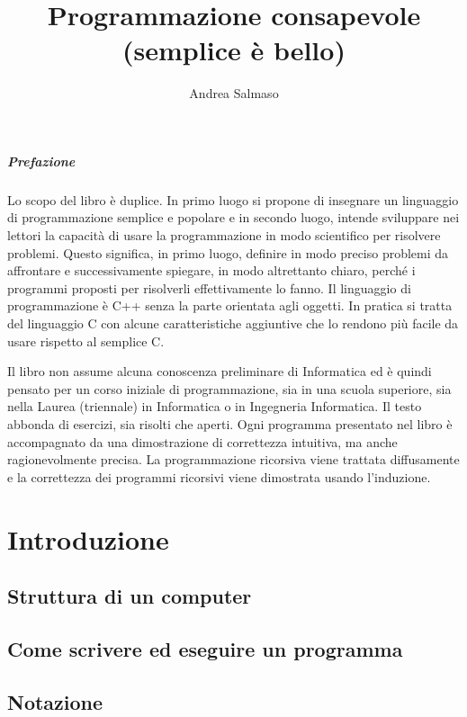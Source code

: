 \documentclass[a4paper,12pt]{book}
\begin{document}
\author{Andrea Salmaso}
\title{Programmazione consapevole \\ (semplice è bello)}
\maketitle

\tableofcontents

\newpage

\paragraph{Prefazione}
Lo scopo del libro è duplice. In primo luogo si propone di insegnare un linguaggio di programmazione semplice e popolare e in secondo luogo, intende sviluppare nei lettori la capacità di usare la programmazione in modo scientifico per risolvere problemi. Questo significa, in primo luogo, definire in modo preciso  problemi da affrontare e successivamente spiegare, in modo altrettanto chiaro, perché i programmi proposti per risolverli effettivamente lo fanno. Il linguaggio di programmazione è C++ senza la parte orientata agli oggetti. In pratica si tratta del linguaggio C con alcune caratteristiche aggiuntive che lo rendono più facile da usare rispetto al semplice C.

Il libro non assume alcuna conoscenza preliminare di Informatica ed è quindi pensato per un corso iniziale di programmazione, sia in una scuola superiore, sia nella Laurea (triennale) in Informatica o in Ingegneria Informatica. Il testo abbonda di esercizi, sia risolti che aperti. Ogni programma presentato nel libro è accompagnato da una dimostrazione di correttezza intuitiva, ma anche ragionevolmente precisa. La programmazione ricorsiva viene trattata diffusamente e la correttezza dei programmi ricorsivi viene dimostrata usando l'induzione.

\chapter{Introduzione}
\section{Struttura di un computer}
\section{Come scrivere ed eseguire un programma}
\section{Notazione}
\end{document}
